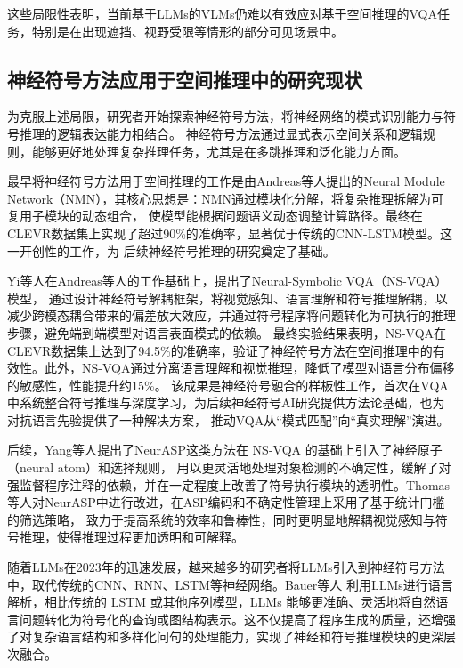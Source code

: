 这些局限性表明，当前基于LLMs的VLMs仍难以有效应对基于空间推理的VQA任务，特别是在出现遮挡、视野受限等情形的部分可见场景中。
\subsection{神经符号方法应用于空间推理中的研究现状}
为克服上述局限，研究者开始探索神经符号方法，将神经网络的模式识别能力与符号推理的逻辑表达能力相结合。
神经符号方法通过显式表示空间关系和逻辑规则，能够更好地处理复杂推理任务，尤其是在多跳推理和泛化能力方面。

最早将神经符号方法用于空间推理的工作是由Andreas等人\cite{andreas2016neural}提出的Neural Module Network（NMN），其核心思想是：NMN通过模块化分解，将复杂推理拆解为可复用子模块的动态组合，
使模型能根据问题语义动态调整计算路径。最终在CLEVR数据集上实现了超过90\%的准确率，显著优于传统的CNN-LSTM模型。这一开创性的工作，为
后续神经符号推理的研究奠定了基础。

Yi等人\cite{yi2019neuralsymbolicvqadisentanglingreasoning}在Andreas等人的工作基础上，提出了Neural-Symbolic VQA（NS-VQA）模型，
通过设计神经符号解耦框架，将视觉感知、语言理解和符号推理解耦，以减少跨模态耦合带来的偏差放大效应，并通过符号程序将问题转化为可执行的推理步骤，避免端到端模型对语言表面模式的依赖。
最终实验结果表明，NS-VQA在CLEVR数据集上达到了94.5\%的准确率，验证了神经符号方法在空间推理中的有效性。此外，NS-VQA通过分离语言理解和视觉推理，降低了模型对语言分布偏移的敏感性，性能提升约15\%。
该成果是神经符号融合的样板性工作，首次在VQA中系统整合符号推理与深度学习，为后续神经符号AI研究提供方法论基础，也为对抗语言先验提供了一种解决方案，
推动VQA从“模式匹配”向“真实理解”演进。

后续，Yang等人\cite{yang2020neurasp}提出了NeurASP这类方法在 NS-VQA 的基础上引入了神经原子（neural atom）和选择规则，
用以更灵活地处理对象检测的不确定性，缓解了对强监督程序注释的依赖，并在一定程度上改善了符号执行模块的透明性。Thomas等人\cite{eiter2022neuro}对NeurASP中进行改进，在ASP编码和不确定性管理上采用了基于统计门槛的筛选策略，
致力于提高系统的效率和鲁棒性，同时更明显地解耦视觉感知与符号推理，使得推理过程更加透明和可解释。

随着LLMs在2023年的迅速发展，越来越多的研究者将LLMs引入到神经符号方法中，取代传统的CNN、RNN、LSTM等神经网络。Bauer\cite{bauer2023neuro}等人
利用LLMs进行语言解析，相比传统的 LSTM 或其他序列模型，LLMs 能够更准确、灵活地将自然语言问题转化为符号化的查询或图结构表示。这不仅提高了程序生成的质量，还增强了对复杂语言结构和多样化问句的处理能力，实现了神经和符号推理模块的更深层次融合。

